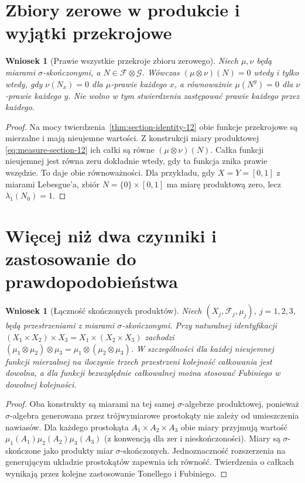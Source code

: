 \documentclass[11pt,a4paper,oneside]{book}
\numberwithin{equation}{chapter}
\theoremstyle{plain}
\newtheorem{wniosek}[twierdzenie]{Wniosek}
\theoremstyle{definition}
\theoremstyle{remark}
\begin{document}
\section{Zbiory zerowe w produkcie i wyjątki przekrojowe}

\begin{wniosek}[Prawie wszystkie przekroje zbioru zerowego]
\label{cor:null-sections-12}
Niech $\mu,\nu$ będą miarami $\sigma$-skończonymi,
a $N\in\mathcal F\otimes\mathcal G$. Wówczas
$(\mu\otimes\nu)(N)=0$ wtedy i tylko wtedy, gdy
$\nu(N_x)=0$ dla $\mu$-prawie każdego $x$, a równoważnie
$\mu(N^y)=0$ dla $\nu$-prawie każdego $y$.
Nie wolno w tym stwierdzeniu zastępować
\emph{prawie każdego} przez \emph{każdego}.
\end{wniosek}
\begin{proof}
Na mocy twierdzenia~\ref{thm:section-identity-12}
obie funkcje przekrojowe są mierzalne i mają
nieujemne wartości. Z konstrukcji miary produktowej
\eqref{eq:measure-section-12} ich całki są równe
$(\mu\otimes\nu)(N)$. Całka funkcji nieujemnej
jest równa zeru dokładnie wtedy, gdy ta funkcja
znika prawie wszędzie. To daje obie równoważności.
Dla przykładu, gdy $X=Y=[0,1]$ z miarami Lebesgue'a,
zbiór $N=\{0\}\times[0,1]$ ma miarę produktową zero,
lecz $\lambda_1(N_0)=1$.
\end{proof}

\section{Więcej niż dwa czynniki i zastosowanie do prawdopodobieństwa}

\begin{wniosek}[Łączność skończonych produktów]
\label{cor:associative-product-12}
Niech $(X_j,\mathcal F_j,\mu_j)$, $j=1,2,3$,
będą przestrzeniami z miarami $\sigma$-skończonymi.
Przy naturalnej identyfikacji
$(X_1\times X_2)\times X_3=X_1\times(X_2\times X_3)$
zachodzi
$(\mu_1\otimes\mu_2)\otimes\mu_3
=\mu_1\otimes(\mu_2\otimes\mu_3)$.
W szczególności dla każdej nieujemnej funkcji
mierzalnej na iloczynie trzech przestrzeni
kolejność całkowania jest dowolna, a dla funkcji
bezwzględnie całkowalnej można stosować Fubiniego
w dowolnej kolejności.
\end{wniosek}
\begin{proof}
Oba konstrukty są miarami na tej samej
$\sigma$-algebrze produktowej, ponieważ
$\sigma$-algebra generowana przez trójwymiarowe
prostokąty nie zależy od umieszczenia nawiasów.
Dla każdego prostokąta $A_1\times A_2\times A_3$
obie miary przyjmują wartość
$\mu_1(A_1)\mu_2(A_2)\mu_3(A_3)$
(z konwencją dla zer i nieskończoności).
Miary są $\sigma$-skończone jako produkty miar
$\sigma$-skończonych. Jednoznaczność rozszerzenia
na generującym układzie prostokątów zapewnia ich
równość. Twierdzenia o całkach wynikają przez
kolejne zastosowanie Tonellego i Fubiniego.
\end{proof}
\end{document}
